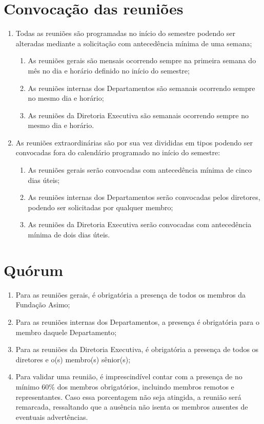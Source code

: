     \section{Convocação das reuniões}
    \begin{enumerate}
        \item Todas as reuniões são programadas no início do semestre podendo ser alteradas mediante a solicitação com antecedência mínima de uma semana;
        \begin{enumerate}
            \item As reuniões gerais são mensais ocorrendo sempre na primeira semana do mês no dia e horário definido no início do semestre;
            \item As reuniões internas dos Departamentos são semanais ocorrendo sempre no mesmo dia e horário;
            \item As reuniões da Diretoria Executiva são semanais ocorrendo sempre no mesmo dia e horário.
        \end{enumerate}
        \item As reuniões extraordinárias são por sua vez divididas em tipos podendo ser convocadas fora do calendário programado no início do semestre: 
        \begin{enumerate}
            \item As reuniões gerais serão convocadas com antecedência mínima de cinco dias úteis;
            \item As reuniões internas dos Departamentos serão convocadas pelos diretores, podendo ser solicitadas por qualquer membro;
            \item As reuniões da Diretoria Executiva serão convocadas com antecedência mínima de dois dias úteis.
        \end{enumerate}
    \end{enumerate}
    \section{Quórum}
        \begin{enumerate}
            \item Para as reuniões gerais, é obrigatória a presença de todos os membros da Fundação Asimo;
            \item Para as reuniões internas dos Departamentos, a presença é obrigatória para o membro daquele Departamento;
            \item Para as reuniões da Diretoria Executiva, é obrigatória a presença de todos os diretores e o(s) membro(s) sênior(s);
            \item Para validar uma reunião, é imprescindível contar com a presença de no mínimo 60$\%$ dos membros obrigatórios, incluindo membros remotos e representantes. Caso essa porcentagem não seja atingida, a reunião será remarcada, ressaltando que a ausência não isenta os membros ausentes de eventuais advertências.
        \end{enumerate}

